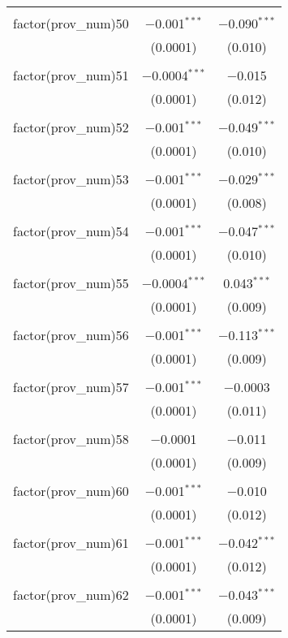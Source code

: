 \begin{table}[ht!]
\begin{tabular}{@{\extracolsep{5pt}}lcc}
  & & \\ 
 factor(prov\_num)50 & $-$0.001$^{***}$ & $-$0.090$^{***}$ \\ 
  & (0.0001) & (0.010) \\ 
  & & \\ 
 factor(prov\_num)51 & $-$0.0004$^{***}$ & $-$0.015 \\ 
  & (0.0001) & (0.012) \\ 
  & & \\ 
 factor(prov\_num)52 & $-$0.001$^{***}$ & $-$0.049$^{***}$ \\ 
  & (0.0001) & (0.010) \\ 
  & & \\ 
 factor(prov\_num)53 & $-$0.001$^{***}$ & $-$0.029$^{***}$ \\ 
  & (0.0001) & (0.008) \\ 
  & & \\ 
 factor(prov\_num)54 & $-$0.001$^{***}$ & $-$0.047$^{***}$ \\ 
  & (0.0001) & (0.010) \\ 
  & & \\ 
 factor(prov\_num)55 & $-$0.0004$^{***}$ & 0.043$^{***}$ \\ 
  & (0.0001) & (0.009) \\ 
  & & \\ 
 factor(prov\_num)56 & $-$0.001$^{***}$ & $-$0.113$^{***}$ \\ 
  & (0.0001) & (0.009) \\ 
  & & \\ 
 factor(prov\_num)57 & $-$0.001$^{***}$ & $-$0.0003 \\ 
  & (0.0001) & (0.011) \\ 
  & & \\ 
 factor(prov\_num)58 & $-$0.0001 & $-$0.011 \\ 
  & (0.0001) & (0.009) \\ 
  & & \\ 
 factor(prov\_num)60 & $-$0.001$^{***}$ & $-$0.010 \\ 
  & (0.0001) & (0.012) \\ 
  & & \\ 
 factor(prov\_num)61 & $-$0.001$^{***}$ & $-$0.042$^{***}$ \\ 
  & (0.0001) & (0.012) \\ 
  & & \\ 
 factor(prov\_num)62 & $-$0.001$^{***}$ & $-$0.043$^{***}$ \\ 
  & (0.0001) & (0.009) \\ 

\end{tabular}
\end{table}
